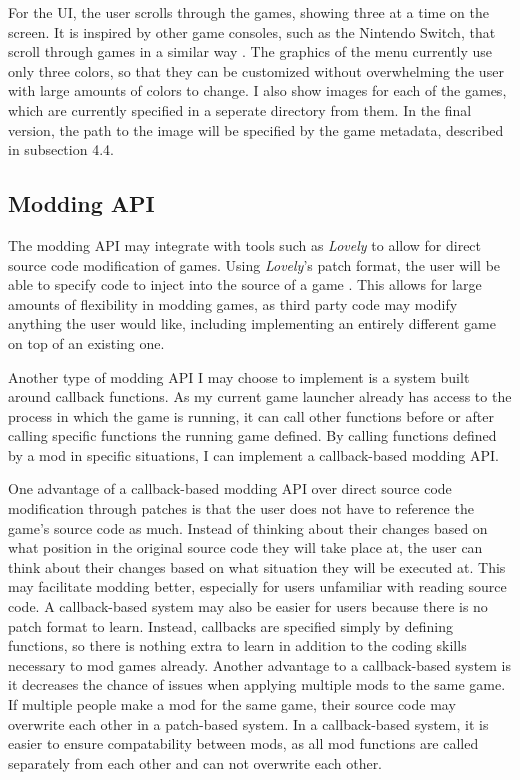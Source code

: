 \documentclass[10pt,twocolumn]{article}
\begin{document}
For the UI, the user scrolls through the games, showing three at a time on the
screen. It is inspired by other game consoles, such as the Nintendo Switch, that
scroll through games in a similar way \cite{noauthor_nintendo_nodate}. The
graphics of the menu currently use only three colors, so that they can be
customized without overwhelming the user with large amounts of colors to change.
I also show images for each of the games, which are currently specified in a
seperate directory from them. In the final version, the path to the image will
be specified by the game metadata, described in subsection 4.4.

\subsection{Modding API}

The modding API may integrate with tools such as \textit{Lovely}
to allow for direct
source code modification of games. Using \textit{Lovely}'s patch format,
the user will be
able to specify code to inject into the source of a game
\cite{green_ethangreen-devlovely-injector_2025}. This allows for large
amounts of flexibility in modding games, as third party code may modify anything
the user would like, including implementing an entirely different game on top of
an existing one.

Another type of modding API I may choose to implement is a system built around
callback functions. As my current game launcher already has access to the
process in which the game is running, it can call other functions before or
after calling specific functions the running game defined. By calling functions
defined by a mod in specific situations, I can implement a callback-based
modding API.

One advantage of a callback-based modding API over direct source code
modification through patches is that the user does not have to reference the
game's source code as much. Instead of thinking about their changes based on
what position in the original source code they will take place at, the user can
think about their changes based on what situation they will be executed at. This
may facilitate modding better, especially for users unfamiliar with reading
source code. A callback-based system may also be easier for users because there
is no patch format to learn. Instead, callbacks are specified simply by defining
functions, so there is nothing extra to learn in addition to the coding skills
necessary to mod games already. Another advantage to a callback-based system is
it decreases the chance of issues when applying multiple mods to the same game.
If multiple people make a mod for the same game, their source code may overwrite
each other in a patch-based system. In a callback-based system, it is easier to
ensure compatability between mods, as all mod functions are called separately
from each other and can not overwrite each other.
\end{document}
